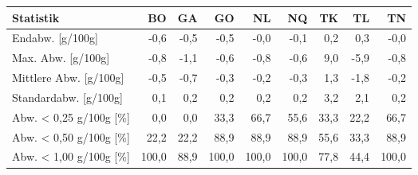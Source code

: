 \begin{tabular}{lrrrrrrrr}
\toprule
             Statistik &    BO &   GA &    GO &    NL &    NQ &   TK &   TL &    TN \\
\midrule
      Endabw. [g/100g] &  -0,6 & -0,5 &  -0,5 &  -0,0 &  -0,1 &  0,2 &  0,3 &  -0,0 \\
    Max. Abw. [g/100g] &  -0,8 & -1,1 &  -0,6 &  -0,8 &  -0,6 &  9,0 & -5,9 &  -0,8 \\
Mittlere Abw. [g/100g] &  -0,5 & -0,7 &  -0,3 &  -0,2 &  -0,3 &  1,3 & -1,8 &  -0,2 \\
Standardabw. [g/100g]  &   0,1 &  0,2 &   0,2 &   0,2 &   0,2 &  3,2 &  2,1 &   0,2 \\
Abw. < 0,25 g/100g [\%] &   0,0 &  0,0 &  33,3 &  66,7 &  55,6 & 33,3 & 22,2 &  66,7 \\
Abw. < 0,50 g/100g [\%] &  22,2 & 22,2 &  88,9 &  88,9 &  88,9 & 55,6 & 33,3 &  88,9 \\
Abw. < 1,00 g/100g [\%] & 100,0 & 88,9 & 100,0 & 100,0 & 100,0 & 77,8 & 44,4 & 100,0 \\
\bottomrule
\end{tabular}
